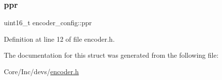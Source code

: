 \subsubsection{\texorpdfstring{ppr}{ppr}}
{\footnotesize\ttfamily uint16\+\_\+t encoder\+\_\+config\+::ppr}



Definition at line 12 of file encoder.\+h.



The documentation for this struct was generated from the following file\+:\begin{DoxyCompactItemize}
\item 
Core/\+Inc/devs/\mbox{\hyperlink{encoder_8h}{encoder.\+h}}\end{DoxyCompactItemize}
